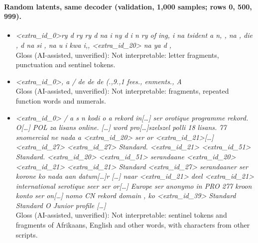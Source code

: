 \documentclass[11pt,a4paper]{article}
\begin{document}
\paragraph{Random latents, same decoder (validation, 1,000 samples; rows 0, 500, 999).}
\begin{itemize}\small
\item[0] \emph{\textless{}extra\_id\_0\textgreater{}ry d ry ry d na i ny d i n ry of ing,  i na tsident a n, ,  na , die , d  na si , na u i kwa i,, \textless{}extra\_id\_20\textgreater{} na ya d ,}\\
Gloss (AI-assisted, unverified): Not interpretable: letter fragments, punctuation and sentinel tokens.
\item[500] \emph{\textless{}extra\_id\_0\textgreater{}, a / de de de (.,9.,1 fees., enments., A}\\
Gloss (AI-assisted, unverified): Not interpretable: fragments, repeated function words and numerals.
\item[999] \emph{\textless{}extra\_id\_0\textgreater{} / a s n kodi o a rekord in[\ldots] ser orotique programme rekord. O[\ldots] POL za lisans online. [\ldots] word pro[\ldots]szelszel polli 18 lisans. 77 snomercial ne nada a \textless{}extra\_id\_20\textgreater{} ser or \textless{}extra\_id\_21\textgreater{}[\ldots] \textless{}extra\_id\_27\textgreater{} \textless{}extra\_id\_27\textgreater{} Standard. \textless{}extra\_id\_21\textgreater{} \textless{}extra\_id\_51\textgreater{} Standard. \textless{}extra\_id\_20\textgreater{} \textless{}extra\_id\_51\textgreater{} serandaane \textless{}extra\_id\_20\textgreater{} \textless{}extra\_id\_21\textgreater{} \textless{}extra\_id\_21\textgreater{} Standard \textless{}extra\_id\_27\textgreater{} serandaaner ser korone ko nada aan datum[\ldots]r [\ldots] naar \textless{}extra\_id\_21\textgreater{} deel \textless{}extra\_id\_21\textgreater{} international serotique seer ser or[\ldots] Europe ser anonymo in PRO 277 kroon konto ser on[\ldots] nomo CN rekord domain , ko \textless{}extra\_id\_39\textgreater{} Standard Standard O Junior profile [\ldots]}\\
Gloss (AI-assisted, unverified): Not interpretable: sentinel tokens and fragments of Afrikaans, English and other words, with characters from other scripts.
\end{itemize}
\end{document}
